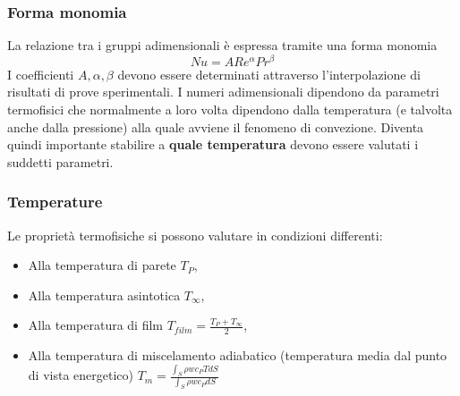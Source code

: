 \subsubsection{Forma monomia}
La relazione tra i gruppi adimensionali è espressa tramite una forma monomia 
\[
    Nu = A R e^\alpha Pr^\beta
\]
I coefficienti $A, \alpha, \beta$ devono essere determinati attraverso l'interpolazione di risultati di prove sperimentali.\newline
\newline
I numeri adimensionali dipendono da parametri termofisici che normalmente a
loro volta dipendono dalla temperatura (e talvolta anche dalla pressione) alla
quale avviene il fenomeno di convezione. Diventa quindi importante stabilire a
\textbf{quale temperatura} devono essere valutati i suddetti parametri.
\subsubsection{Temperature}
Le proprietà termofisiche si possono valutare in condizioni differenti:
\begin{itemize}
    \item Alla temperatura di parete $T_P$,
    \item Alla temperatura asintotica $T_\infty$,
    \item Alla temperatura di film $T_{film} = \frac{T_P + T_\infty}{2}$,
    \item Alla temperatura di miscelamento adiabatico (temperatura media dal punto di vista energetico) $T_m = \frac{\int_S \rho w c_P T dS}{\int_S \rho w c_P dS}$
\end{itemize}
